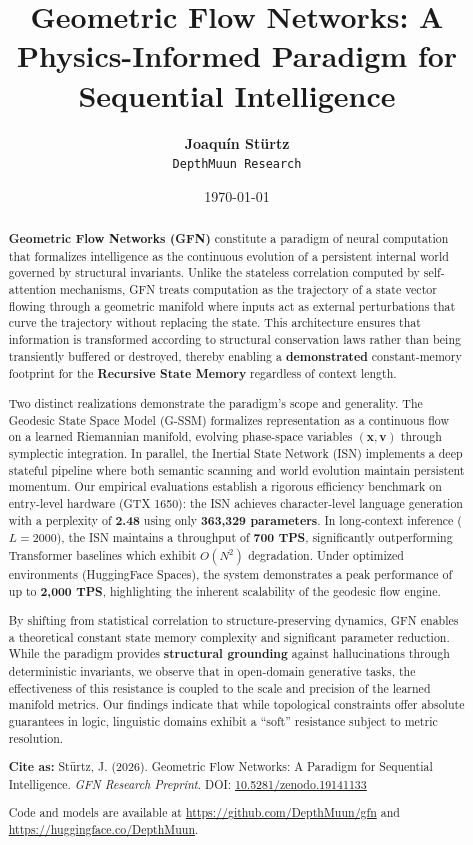 \documentclass[12pt,a4paper]{article}
\title{\textbf{Geometric Flow Networks: A Physics-Informed Paradigm for Sequential Intelligence}}
\author{
    \textbf{Joaqu\'in St\"urtz} \\
    \texttt{DepthMuun Research}
}
\date{\today}
\begin{document}
\maketitle

\begin{abstract}
\textbf{Geometric Flow Networks (GFN)} constitute a paradigm of neural computation that formalizes intelligence as the continuous evolution of a persistent internal world governed by structural invariants. Unlike the stateless correlation computed by self-attention mechanisms, GFN treats computation as the trajectory of a state vector flowing through a geometric manifold where inputs act as external perturbations that curve the trajectory without replacing the state. This architecture ensures that information is transformed according to structural conservation laws rather than being transiently buffered or destroyed, thereby enabling a \textbf{demonstrated} constant-memory footprint for the \textbf{Recursive State Memory} regardless of context length.

Two distinct realizations demonstrate the paradigm's scope and generality. The Geodesic State Space Model (G-SSM) formalizes representation as a continuous flow on a learned Riemannian manifold, evolving phase-space variables $(\mathbf{x}, \mathbf{v})$ through symplectic integration. In parallel, the Inertial State Network (ISN) implements a deep stateful pipeline where both semantic scanning and world evolution maintain persistent momentum. Our empirical evaluations establish a rigorous efficiency benchmark on entry-level hardware (GTX 1650): the ISN achieves character-level language generation with a perplexity of \textbf{2.48} using only \textbf{363,329 parameters}. In long-context inference ($L=2000$), the ISN maintains a throughput of \textbf{700 TPS}, significantly outperforming Transformer baselines which exhibit $O(N^2)$ degradation. Under optimized environments (HuggingFace Spaces), the system demonstrates a peak performance of up to \textbf{2,000 TPS}, highlighting the inherent scalability of the geodesic flow engine.

By shifting from statistical correlation to structure-preserving dynamics, GFN enables a theoretical constant state memory complexity and significant parameter reduction. While the paradigm provides \textbf{structural grounding} against hallucinations through deterministic invariants, we observe that in open-domain generative tasks, the effectiveness of this resistance is coupled to the scale and precision of the learned manifold metrics. Our findings indicate that while topological constraints offer absolute guarantees in logic, linguistic domains exhibit a ``soft'' resistance subject to metric resolution.

\vspace{1em}
\noindent \textbf{Cite as:} St\"urtz, J. (2026). Geometric Flow Networks: A Paradigm for Sequential Intelligence. \textit{GFN Research Preprint}. DOI: \href{https://doi.org/10.5281/zenodo.19141133}{10.5281/zenodo.19141133}

Code and models are available at \url{https://github.com/DepthMuun/gfn} and \url{https://huggingface.co/DepthMuun}.
\end{abstract}
\end{document}
